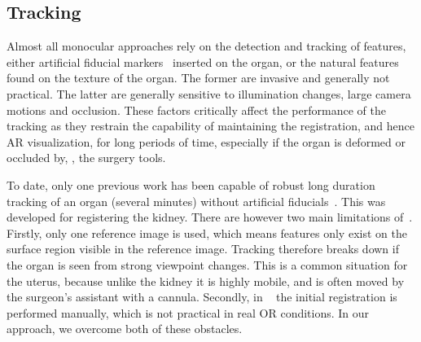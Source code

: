 
\subsection{Tracking}
\label{sec:sotaTracking}
Almost all monocular approaches rely on the detection and tracking of features, either artificial fiducial markers~\cite{Cohen2010Prostate} inserted on the organ, or the natural features found on the texture of the organ. The former are invasive and generally not practical. The latter are generally sensitive to illumination changes, large camera motions and occlusion. These factors critically affect the performance of the tracking as they restrain the capability of maintaining the registration, and hence AR visualization, for long periods of time, especially if the organ is deformed or occluded by, \eg, the surgery tools. 

To date, only one previous work has been capable of robust long duration tracking of an organ (several minutes) without artificial fiducials~\cite{affineTracking}. 
This was developed for registering the kidney. %
There are however two main limitations of~\cite{affineTracking}. 
Firstly, only one reference image is used, which means features only exist on the surface region visible in the reference image. 
Tracking therefore breaks down if the organ is seen from strong viewpoint changes. This is a common situation for the uterus, because unlike the kidney it is highly mobile, and is often moved by the surgeon's assistant with a cannula. 
Secondly, in ~\cite{affineTracking} the initial registration is performed manually, which is not practical in real OR conditions. 
In our approach, we overcome both of these obstacles. 



